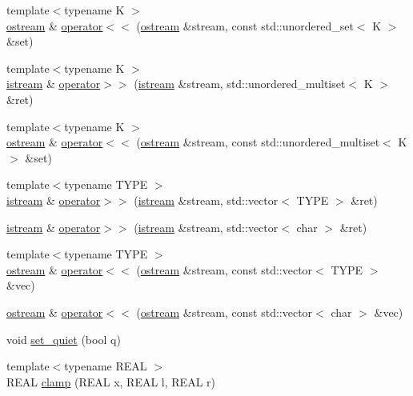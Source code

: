 \begin{DoxyCompactItemize}
\item 
{\footnotesize template$<$typename K $>$ }\\\hyperlink{classmui_1_1ostream}{ostream} \& \hyperlink{namespacemui_a0d6169e01cb142902dfffa692610c49c}{operator$<$$<$} (\hyperlink{classmui_1_1ostream}{ostream} \&stream, const std\+::unordered\+\_\+set$<$ K $>$ \&set)
\item 
{\footnotesize template$<$typename K $>$ }\\\hyperlink{classmui_1_1istream}{istream} \& \hyperlink{namespacemui_adefa60318c46c05b933ad960b5b19db0}{operator$>$$>$} (\hyperlink{classmui_1_1istream}{istream} \&stream, std\+::unordered\+\_\+multiset$<$ K $>$ \&ret)
\item 
{\footnotesize template$<$typename K $>$ }\\\hyperlink{classmui_1_1ostream}{ostream} \& \hyperlink{namespacemui_a2b43d4ae1d37d8f12b77cae58128eea5}{operator$<$$<$} (\hyperlink{classmui_1_1ostream}{ostream} \&stream, const std\+::unordered\+\_\+multiset$<$ K $>$ \&set)
\item 
{\footnotesize template$<$typename T\+Y\+PE $>$ }\\\hyperlink{classmui_1_1istream}{istream} \& \hyperlink{namespacemui_af482c6c6fae6770318a0d4937cb05cf9}{operator$>$$>$} (\hyperlink{classmui_1_1istream}{istream} \&stream, std\+::vector$<$ T\+Y\+PE $>$ \&ret)
\item 
\hyperlink{classmui_1_1istream}{istream} \& \hyperlink{namespacemui_a8fbed71bb535994e689dc3c283556ffb}{operator$>$$>$} (\hyperlink{classmui_1_1istream}{istream} \&stream, std\+::vector$<$ char $>$ \&ret)
\item 
{\footnotesize template$<$typename T\+Y\+PE $>$ }\\\hyperlink{classmui_1_1ostream}{ostream} \& \hyperlink{namespacemui_a53dd1ab5a10e8b488256e61cd2f66860}{operator$<$$<$} (\hyperlink{classmui_1_1ostream}{ostream} \&stream, const std\+::vector$<$ T\+Y\+PE $>$ \&vec)
\item 
\hyperlink{classmui_1_1ostream}{ostream} \& \hyperlink{namespacemui_abbd4806303696928dad09b28de5657c6}{operator$<$$<$} (\hyperlink{classmui_1_1ostream}{ostream} \&stream, const std\+::vector$<$ char $>$ \&vec)
\item 
void \hyperlink{namespacemui_af5001a076f3999ef42a472f24cd23e8c}{set\+\_\+quiet} (bool q)
\item 
{\footnotesize template$<$typename R\+E\+AL $>$ }\\R\+E\+AL \hyperlink{namespacemui_ad6e3ca675b42ee8b65ded570c858b442}{clamp} (R\+E\+AL x, R\+E\+AL l, R\+E\+AL r)

\end{DoxyCompactItemize}
